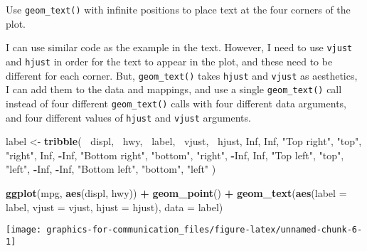 \documentclass[]{book}
\newenvironment{Shaded}{\begin{snugshade}}{\end{snugshade}}
\newcommand{\DataTypeTok}[1]{\textcolor[rgb]{0.13,0.29,0.53}{#1}}
\newcommand{\KeywordTok}[1]{\textcolor[rgb]{0.13,0.29,0.53}{\textbf{#1}}}
\newcommand{\NormalTok}[1]{#1}
\newcommand{\OperatorTok}[1]{\textcolor[rgb]{0.81,0.36,0.00}{\textbf{#1}}}
\newcommand{\OtherTok}[1]{\textcolor[rgb]{0.56,0.35,0.01}{#1}}
\newcommand{\StringTok}[1]{\textcolor[rgb]{0.31,0.60,0.02}{#1}}
\theoremstyle{plain}
\theoremstyle{remark}
\theoremstyle{definition}
\theoremstyle{definition}
\theoremstyle{definition}
\theoremstyle{remark}
\begin{document}
Use \texttt{geom\_text()} with infinite positions to place text at the
four corners of the plot.

I can use similar code as the example in the text. However, I need to
use \texttt{vjust} and \texttt{hjust} in order for the text to appear in
the plot, and these need to be different for each corner. But,
\texttt{geom\_text()} takes \texttt{hjust} and \texttt{vjust} as
aesthetics, I can add them to the data and mappings, and use a single
\texttt{geom\_text()} call instead of four different
\texttt{geom\_text()} calls with four different data arguments, and four
different values of \texttt{hjust} and \texttt{vjust} arguments.

\begin{Shaded}
\begin{Highlighting}[]
\NormalTok{label <-}\StringTok{ }\KeywordTok{tribble}\NormalTok{(}
  \OperatorTok{~}\NormalTok{displ, }\OperatorTok{~}\NormalTok{hwy, }\OperatorTok{~}\NormalTok{label, }\OperatorTok{~}\NormalTok{vjust, }\OperatorTok{~}\NormalTok{hjust,}
     \OtherTok{Inf}\NormalTok{,  }\OtherTok{Inf}\NormalTok{,    }\StringTok{"Top right"}\NormalTok{, }\StringTok{"top"}\NormalTok{, }\StringTok{"right"}\NormalTok{,}
     \OtherTok{Inf}\NormalTok{, }\OperatorTok{-}\OtherTok{Inf}\NormalTok{,    }\StringTok{"Bottom right"}\NormalTok{, }\StringTok{"bottom"}\NormalTok{, }\StringTok{"right"}\NormalTok{,}
    \OperatorTok{-}\OtherTok{Inf}\NormalTok{,  }\OtherTok{Inf}\NormalTok{,    }\StringTok{"Top left"}\NormalTok{, }\StringTok{"top"}\NormalTok{, }\StringTok{"left"}\NormalTok{,}
    \OperatorTok{-}\OtherTok{Inf}\NormalTok{, }\OperatorTok{-}\OtherTok{Inf}\NormalTok{,    }\StringTok{"Bottom left"}\NormalTok{, }\StringTok{"bottom"}\NormalTok{, }\StringTok{"left"}
\NormalTok{)}

\KeywordTok{ggplot}\NormalTok{(mpg, }\KeywordTok{aes}\NormalTok{(displ, hwy)) }\OperatorTok{+}
\StringTok{  }\KeywordTok{geom_point}\NormalTok{() }\OperatorTok{+}
\StringTok{  }\KeywordTok{geom_text}\NormalTok{(}\KeywordTok{aes}\NormalTok{(}\DataTypeTok{label =}\NormalTok{ label, }\DataTypeTok{vjust =}\NormalTok{ vjust, }\DataTypeTok{hjust =}\NormalTok{ hjust), }\DataTypeTok{data =}\NormalTok{ label)}
\end{Highlighting}
\end{Shaded}

\begin{center}\texttt{[image: graphics-for-communication\_files/figure-latex/unnamed-chunk-6-1]} \end{center}
\end{document}
